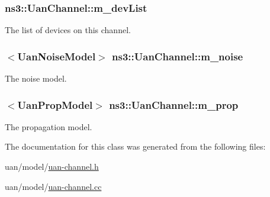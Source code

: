 \subsubsection[{\texorpdfstring{m\+\_\+dev\+List}{m_devList}}]{ ns3\+::\+Uan\+Channel\+::m\+\_\+dev\+List\hspace{0.3cm}{\ttfamily [private]}}\hypertarget{classns3_1_1UanChannel_aeabcd3ac6ad6e591c06fba9553cad25c}{}\label{classns3_1_1UanChannel_aeabcd3ac6ad6e591c06fba9553cad25c}


The list of devices on this channel. 

\subsubsection[{\texorpdfstring{m\+\_\+noise}{m_noise}}]{$<${\bf Uan\+Noise\+Model}$>$ ns3\+::\+Uan\+Channel\+::m\+\_\+noise\hspace{0.3cm}{\ttfamily [private]}}\hypertarget{classns3_1_1UanChannel_a838c9526aa0c9683c3d390ffd14e4d77}{}\label{classns3_1_1UanChannel_a838c9526aa0c9683c3d390ffd14e4d77}


The noise model. 

\subsubsection[{\texorpdfstring{m\+\_\+prop}{m_prop}}]{$<${\bf Uan\+Prop\+Model}$>$ ns3\+::\+Uan\+Channel\+::m\+\_\+prop\hspace{0.3cm}{\ttfamily [private]}}\hypertarget{classns3_1_1UanChannel_a630aeb5f0a32347fbde527697e879268}{}\label{classns3_1_1UanChannel_a630aeb5f0a32347fbde527697e879268}


The propagation model. 



The documentation for this class was generated from the following files\+:\begin{DoxyCompactItemize}
\item 
uan/model/\hyperlink{uan-channel_8h}{uan-\/channel.\+h}\item 
uan/model/\hyperlink{uan-channel_8cc}{uan-\/channel.\+cc}\end{DoxyCompactItemize}
